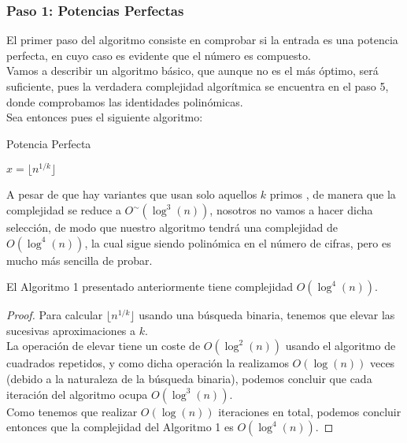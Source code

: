 \subsubsection{Paso 1: Potencias Perfectas}

El primer paso del algoritmo consiste en comprobar si la entrada es una potencia perfecta, en cuyo caso es evidente que el número es compuesto.\\

Vamos a describir un algoritmo básico, que aunque no es el más óptimo, será suficiente, pues la verdadera complejidad algorítmica se encuentra en el paso 5, donde comprobamos las identidades polinómicas.\\

Sea entonces pues el siguiente algoritmo:

\begin{algorithm}
	\caption{Potencia Perfecta}\label{perfect_power}
	\begin{algorithmic}[1]
				\State $x = \lfloor n^{1/k} \rfloor$
					\State {}
				\EndIf
			\EndFor
			\State {}
		\EndProcedure
	\end{algorithmic}
\end{algorithm}

A pesar de que hay variantes que usan solo aquellos $k$ primos \cite{bach_sorenson_1989}, de manera que la complejidad se reduce a $O^\sim(\log^3(n))$, nosotros no vamos a hacer dicha selección, de modo que nuestro algoritmo tendrá una complejidad de $O(\log^4(n))$, la cual sigue siendo polinómica en el número de cifras, pero es mucho más sencilla de probar.\\

\begin{teorema}
	El Algoritmo 1 presentado anteriormente tiene complejidad $O(\log^4(n))$.
\end{teorema}

\begin{proof}
	Para calcular $\lfloor n^{1/k} \rfloor$ usando una búsqueda binaria, tenemos que elevar las sucesivas aproximaciones a $k$.\\
	
	La operación de elevar tiene un coste de $O(\log^2(n))$ usando el algoritmo de cuadrados repetidos, y como dicha operación la realizamos $O(\log(n))$ veces (debido a la naturaleza de la búsqueda binaria), podemos concluir que cada iteración del algoritmo ocupa $O(\log^3(n))$.\\
	
	Como tenemos que realizar $O(\log(n))$ iteraciones en total, podemos concluir entonces que la complejidad del Algoritmo 1 es $O(\log^4(n))$.
\end{proof}


